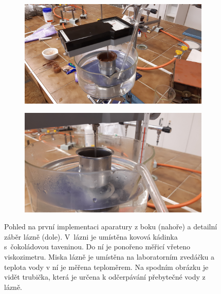 \documentclass[12pt]{article}
\begin{document}
\begin{figure}[h!]
    \begin{subfigure}[b]{\textwidth}
    \centering
        \includegraphics[width = \textwidth]{prilohy/aparatura_lab_bok.jpg}
    \end{subfigure}
    \hfill
    \begin{subfigure}[b]{\textwidth}
        \includegraphics[width = \textwidth]{prilohy/lab_lázeň.jpg}
    \end{subfigure}
    \caption{Pohled na první implementaci aparatury z boku (nahoře) a detailní záběr lázně (dole). V~lázni je umístěna kovová kádinka s~čokoládovou taveninou. Do ní je ponořeno měřicí vřeteno viskozimetru. Miska lázně je umístěna na laboratorním zvedáčku a teplota vody v ní je měřena teploměrem. Na spodním obrázku je vidět trubička, která je určena k odčerpávání přebytečné vody z lázně.}
    \label{fig:aparatura_lab}
\end{figure}
\end{document}
